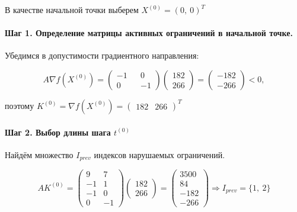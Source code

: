 В качестве начальной точки выберем $X^{(0)} = (0,\ 0)^T$

\paragraph{Шаг 1. Определение матрицы активных ограничений в начальной точке.}

Убедимся в допустимости градиентного направления:

\begin{equation*}
	A \nabla f(X^{(0)}) = \begin{pmatrix}
	-1 && 0 \\ 0 && -1
	\end{pmatrix}
	\begin{pmatrix}
	182 \\ 266
	\end{pmatrix}
	=
	\begin{pmatrix}
	-182 \\ -266
	\end{pmatrix}
	< 0,
\end{equation*}

поэтому $K^{(0)} = \nabla f(X^{(0)}) = \begin{pmatrix}
	182 & 266
	\end{pmatrix}^T$

\paragraph{Шаг 2. Выбор длины шага $t^{(0)}$}

Найдём множество $I_{prev}$ индексов нарушаемых ограничений.

\begin{equation*}
	A K^{(0)} = \begin{pmatrix}
		9 & 7
		\\
		-1 & 1
		\\
		-1 & 0
		\\
		0 & -1
	\end{pmatrix}
	\begin{pmatrix}
		182 \\ 266
	\end{pmatrix}
	=
	\begin{pmatrix}
		3500 \\ 84 \\ -182 \\ -266
	\end{pmatrix}
	\Rightarrow I_{prev} = \{1,\ 2\}
\end{equation*}

